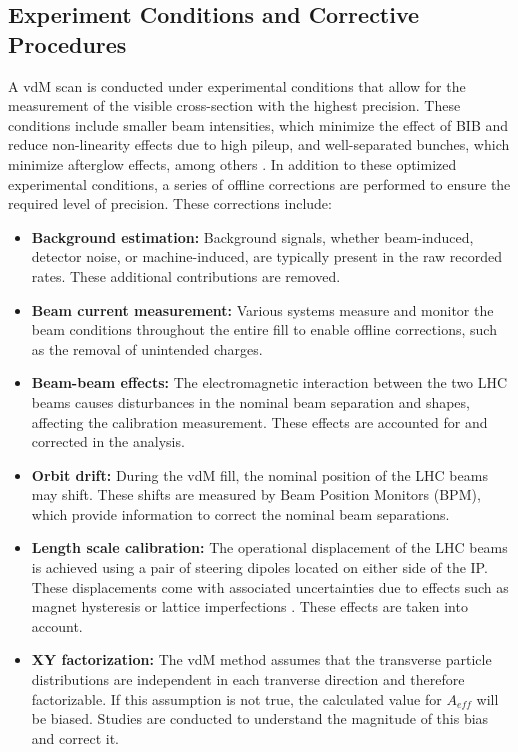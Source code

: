 \subsection{Experiment Conditions and Corrective Procedures}
\label{sec:experiment_conditions_and_corrective_procedures}

A vdM scan is conducted under experimental conditions that allow for the measurement of the visible cross-section with the highest precision. These conditions include smaller beam intensities, which minimize the effect of BIB and reduce non-linearity effects due to high pileup, and well-separated bunches, which minimize afterglow effects, among others \cite{GRAFSTROM201597}. In addition to these optimized experimental conditions, a series of offline corrections are performed to ensure the required level of precision. These corrections include:

\begin{itemize}
    \item \textbf{Background estimation:} Background signals, whether beam-induced, detector noise, or machine-induced, are typically present in the raw recorded rates. These additional contributions are removed.
    \item \textbf{Beam current measurement:} Various systems measure and monitor the beam conditions throughout the entire fill to enable offline corrections, such as the removal of unintended charges.
    \item \textbf{Beam-beam effects:} The electromagnetic interaction between the two LHC beams causes disturbances in the nominal beam separation and shapes, affecting the calibration measurement. These effects are accounted for and corrected in the analysis.
    \item \textbf{Orbit drift:} During the vdM fill, the nominal position of the LHC beams may shift. These shifts are measured by Beam Position Monitors (BPM), which provide information to correct the nominal beam separations.
    \item \textbf{Length scale calibration:} The operational displacement of the LHC beams is achieved using a pair of steering dipoles located on either side of the IP. These displacements come with associated uncertainties due to effects such as magnet hysteresis or lattice imperfections \cite{Persson:2750277}. These effects are taken into account.
    \item \textbf{XY factorization:} The vdM method assumes that the transverse particle distributions are independent in each tranverse direction and therefore factorizable. If this assumption is not true, the calculated value for \(A_{eff}\) will be biased. Studies are conducted to understand the magnitude of this bias and correct it.
\end{itemize}

